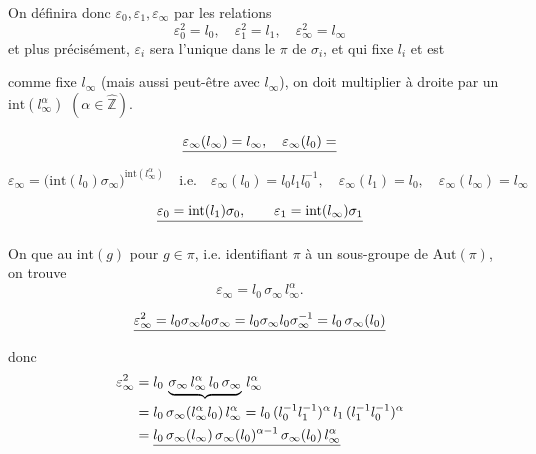 \documentclass[11pt,a4paper]{article}
\begin{document}

On définira donc $\varepsilon_0, \varepsilon_1, \varepsilon_\infty$ par les relations
\[
\varepsilon_0^2 = l_0, \quad \varepsilon_1^2 = l_1, \quad \varepsilon_\infty^2 = l_\infty
\]
et plus précisément, $\varepsilon_i$ sera l'unique \struck{\ill{}} \ill{}
dans le \ill{} $\pi$ de $\sigma_i$, et qui fixe $l_i$ et est \ill{}


comme  fixe $l_\infty$ (mais aussi
peut-être  \ill{} avec $l_\infty$), on doit \ill{} multiplier
à droite par un $\mathrm{int}(l_\infty^{\alpha})$ $(\alpha \in \hat{\mathbb{Z}})$.

\[
\struck{\varepsilon_\infty(l_\infty) = l_\infty, \quad \varepsilon_\infty(l_0) = }
\]
\[
\varepsilon_\infty = \bigl(\mathrm{int}(l_0)\sigma_\infty\bigr)^{\mathrm{int}(l_\infty^{\alpha})}
\quad \text{i.e.} \quad
\varepsilon_\infty(l_0) = l_0 l_1 l_0^{-1}, \quad
\varepsilon_\infty(l_1) = l_0, \quad
\varepsilon_\infty(l_\infty) = l_\infty
\]


\[
\struck{\varepsilon_0 = \mathrm{int}(l_1)\sigma_0, \qquad
\varepsilon_1 = \mathrm{int}(l_\infty)\sigma_1}
\]

On  \ill{}  que  \ill{} au
$\mathrm{int}(g)$ pour $g \in \pi$, i.e. identifiant $\pi$ à un sous-groupe de
$\mathrm{Aut}(\pi)$, on trouve 
\[
\varepsilon_\infty = l_0\, \sigma_\infty\, l_\infty^{\alpha}.
\]


\[
\struck{\varepsilon_\infty^2 = l_0\sigma_\infty l_0 \sigma_\infty
= l_0 \sigma_\infty l_0 \sigma_\infty^{-1} = l_0\, \sigma_\infty(l_0)}
\]
donc
\[
\begin{aligned}
\varepsilon_\infty^2 &= l_0\, \underbrace{\sigma_\infty\, l_\infty^{\alpha}\, l_0\, \sigma_\infty}\, l_\infty^{\alpha} \\
&= l_0\, \sigma_\infty(l_\infty^{\alpha} l_0)\, l_\infty^{\alpha}
= l_0\, (l_0^{-1} l_1^{-1})^{\alpha}\, l_1\, (l_1^{-1} l_0^{-1})^{\alpha} \\
&= \struck{l_0\, \sigma_\infty(l_\infty)\, \sigma_\infty(l_0)^{\alpha-1}\, \sigma_\infty(l_0)\, l_\infty^{\alpha}}
\end{aligned}
\]
\end{document}
